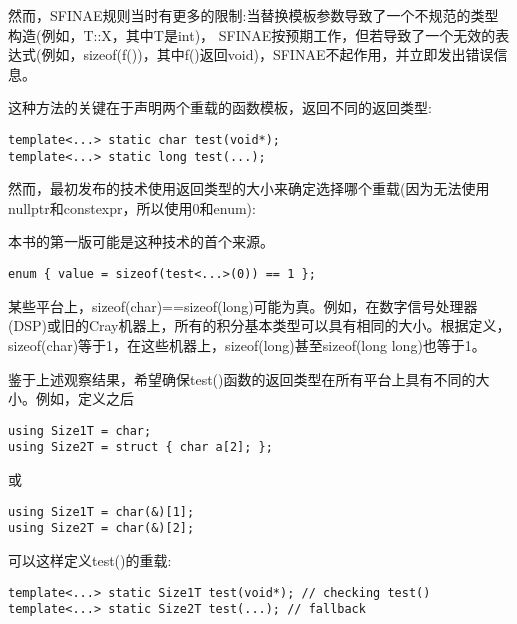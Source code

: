 \begin{tcolorbox}[colback=webgreen!5!white,colframe=webgreen!75!black]
\hspace*{0.75cm}然而，SFINAE规则当时有更多的限制:当替换模板参数导致了一个不规范的类型构造(例如，T::X，其中T是int)， SFINAE按预期工作，但若导致了一个无效的表达式(例如，sizeof(f())，其中f()返回void)，SFINAE不起作用，并立即发出错误信息。
\end{tcolorbox}

这种方法的关键在于声明两个重载的函数模板，返回不同的返回类型:

\begin{lstlisting}[style=styleCXX]
template<...> static char test(void*);
template<...> static long test(...);
\end{lstlisting}

然而，最初发布的技术使用返回类型的大小来确定选择哪个重载(因为无法使用nullptr和constexpr，所以使用0和enum):

\begin{tcolorbox}[colback=webgreen!5!white,colframe=webgreen!75!black]
\hspace*{0.75cm}本书的第一版可能是这种技术的首个来源。
\end{tcolorbox}

\begin{lstlisting}[style=styleCXX]
enum { value = sizeof(test<...>(0)) == 1 };
\end{lstlisting}

某些平台上，sizeof(char)==sizeof(long)可能为真。例如，在数字信号处理器(DSP)或旧的Cray机器上，所有的积分基本类型可以具有相同的大小。根据定义，sizeof(char)等于1，在这些机器上，sizeof(long)甚至sizeof(long long)也等于1。

鉴于上述观察结果，希望确保test()函数的返回类型在所有平台上具有不同的大小。例如，定义之后

\begin{lstlisting}[style=styleCXX]
using Size1T = char;
using Size2T = struct { char a[2]; };
\end{lstlisting}

或

\begin{lstlisting}[style=styleCXX]
using Size1T = char(&)[1];
using Size2T = char(&)[2];
\end{lstlisting}

可以这样定义test()的重载:

\begin{lstlisting}[style=styleCXX]
template<...> static Size1T test(void*); // checking test()
template<...> static Size2T test(...); // fallback
\end{lstlisting}

